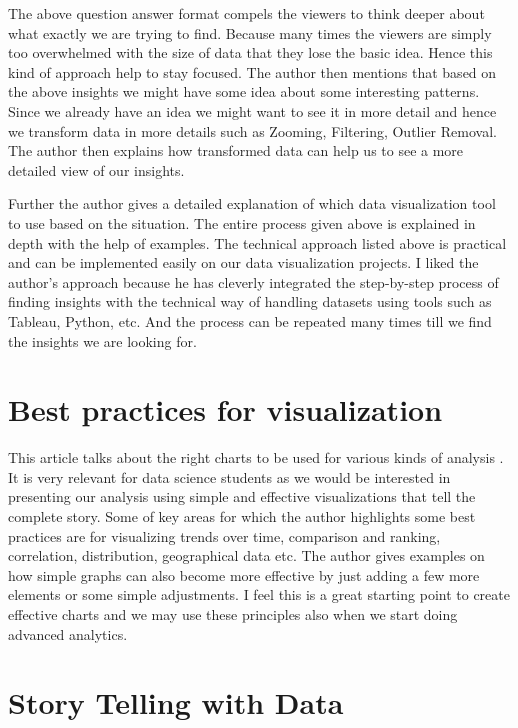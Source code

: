 \documentclass[]{book}
\theoremstyle{definition}
\theoremstyle{definition}
\theoremstyle{definition}
\theoremstyle{remark}
\begin{document}
The above question answer format compels the viewers to think deeper
about what exactly we are trying to find. Because many times the viewers
are simply too overwhelmed with the size of data that they lose the
basic idea. Hence this kind of approach help to stay focused. The author
then mentions that based on the above insights we might have some idea
about some interesting patterns. Since we already have an idea we might
want to see it in more detail and hence we transform data in more
details such as Zooming, Filtering, Outlier Removal. The author then
explains how transformed data can help us to see a more detailed view of
our insights.

Further the author gives a detailed explanation of which data
visualization tool to use based on the situation. The entire process
given above is explained in depth with the help of examples. The
technical approach listed above is practical and can be implemented
easily on our data visualization projects. I liked the author's approach
because he has cleverly integrated the step-by-step process of finding
insights with the technical way of handling datasets using tools such as
Tableau, Python, etc. And the process can be repeated many times till we
find the insights we are looking for.

\section{Best practices for
visualization}\label{best-practices-for-visualization}

This article talks about the right charts to be used for various kinds
of analysis \citep{DataVizBestPrac}. It is very relevant for data
science students as we would be interested in presenting our analysis
using simple and effective visualizations that tell the complete story.
Some of key areas for which the author highlights some best practices
are for visualizing trends over time, comparison and ranking,
correlation, distribution, geographical data etc. The author gives
examples on how simple graphs can also become more effective by just
adding a few more elements or some simple adjustments. I feel this is a
great starting point to create effective charts and we may use these
principles also when we start doing advanced analytics.

\section{Story Telling with Data}\label{story-telling-with-data}
\end{document}
